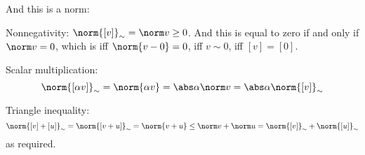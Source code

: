     And this is a norm:
    \benum
        \item Nonnegativity: $\norm{[v]}_\sim=\norm v\geq0$.
        And this is equal to zero if and only if $\norm v=0$, which is iff $\norm{v-0}=0$, iff $v\sim0$, iff $[v]=[0]$.
        \item Scalar multiplication:
        $$ \norm{[\alpha v]}_\sim = \norm{\alpha v} = \abs\alpha\norm v = \abs\alpha\norm{[v]}_\sim $$
        \item Triangle inequality:
        $$ \norm{[v]+[u]}_\sim = \norm{[v+u]}_\sim = \norm{v+u} \leq \norm v + \norm u = \norm{[v]}_\sim + \norm{[u]}_\sim $$
        as required.
        \qqed
    \eenum
\eenum

\bye

